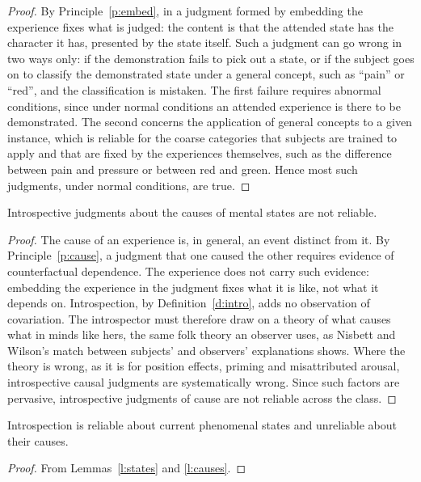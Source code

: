 \documentclass{situationist-preprint}
\begin{document}
\begin{proof}
By Principle~\ref{p:embed}, in a judgment formed by embedding the experience fixes what is judged: the content is that the attended state has the character it has, presented by the state itself. Such a judgment can go wrong in two ways only: if the demonstration fails to pick out a state, or if the subject goes on to classify the demonstrated state under a general concept, such as \enquote{pain} or \enquote{red}, and the classification is mistaken. The first failure requires abnormal conditions, since under normal conditions an attended experience is there to be demonstrated. The second concerns the application of general concepts to a given instance, which is reliable for the coarse categories that subjects are trained to apply and that are fixed by the experiences themselves, such as the difference between pain and pressure or between red and green. Hence most such judgments, under normal conditions, are true.
\end{proof}

\begin{lemma}\label{l:causes}
Introspective judgments about the causes of mental states are not reliable.
\end{lemma}

\begin{proof}
The cause of an experience is, in general, an event distinct from it. By Principle~\ref{p:cause}, a judgment that one caused the other requires evidence of counterfactual dependence. The experience does not carry such evidence: embedding the experience in the judgment fixes what it is like, not what it depends on. Introspection, by Definition~\ref{d:intro}, adds no observation of covariation. The introspector must therefore draw on a theory of what causes what in minds like hers, the same folk theory an observer uses, as Nisbett and Wilson's match between subjects' and observers' explanations shows. Where the theory is wrong, as it is for position effects, priming and misattributed arousal, introspective causal judgments are systematically wrong. Since such factors are pervasive, introspective judgments of cause are not reliable across the class.
\end{proof}

\begin{theorem}\label{t:main}
Introspection is reliable about current phenomenal states and unreliable about their causes.
\end{theorem}

\begin{proof}
From Lemmas~\ref{l:states} and \ref{l:causes}.
\end{proof}
\end{document}
